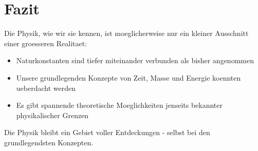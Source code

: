 \documentclass{article}
\begin{document}
	\section{Fazit}
	
	Die Physik, wie wir sie kennen, ist moeglicherweise nur ein kleiner Ausschnitt einer groesseren Realitaet:
	
	\begin{itemize}
		\item Naturkonstanten sind tiefer miteinander verbunden als bisher angenommen
		\item Unsere grundlegenden Konzepte von Zeit, Masse und Energie koennten ueberdacht werden
		\item Es gibt spannende theoretische Moeglichkeiten jenseits bekannter physikalischer Grenzen
	\end{itemize}
	
	Die Physik bleibt ein Gebiet voller Entdeckungen - selbst bei den grundlegendsten Konzepten.
	
\end{document}
